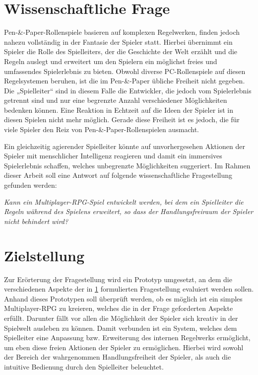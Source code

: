 \section{Wissenschaftliche Frage}
\label{sec:WissenschaftlicheFrage}

Pen-\&-Paper-Rollenspiele basieren auf komplexen Regelwerken, finden jedoch nahezu vollständig in der Fantasie der Spieler statt. Hierbei übernimmt ein Spieler die Rolle des Spielleiters, der die Geschichte der Welt erzählt und die Regeln auslegt und erweitert um den Spielern ein möglichst freies und umfassendes Spielerlebnis zu bieten. Obwohl diverse PC-Rollenspiele auf diesen Regelsystemen beruhen, ist die im Pen-\&-Paper übliche Freiheit nicht gegeben. Die „Spielleiter“ sind in diesem Falle die Entwickler, die jedoch vom Spielerlebnis getrennt sind und nur eine begrenzte Anzahl verschiedener Möglichkeiten bedenken können. Eine Reaktion in Echtzeit auf die Ideen der Spieler ist in diesen Spielen nicht mehr möglich. Gerade diese Freiheit ist es jedoch, die für viele Spieler den Reiz von Pen-\&-Paper-Rollenspielen ausmacht.

Ein gleichzeitig agierender Spielleiter könnte auf unvorhergesehen Aktionen der Spieler mit menschlicher Intelligenz reagieren und damit ein immersives Spielerlebnis schaffen, welches unbegrenzte Möglichkeiten suggeriert.
Im Rahmen dieser Arbeit soll eine Antwort auf folgende wissenschaftliche Fragestellung gefunden werden:
\vspace*{0.5em}\begin{center}\parbox{0.9\linewidth}{
  \emph{Kann ein Multiplayer-RPG-Spiel entwickelt werden, bei dem ein Spielleiter die Regeln während des Spielens erweitert, so dass der Handlungsfreiraum der Spieler nicht behindert wird?}
} \end{center}\vspace*{0.5em}

\section{Zielstellung}
\label{sec:Zielstellung}

Zur Erörterung der Fragestellung wird ein Prototyp umgesetzt, an dem die verschiedenen Aspekte der in \ref{sec:WissenschaftlicheFrage} formulierten Fragestellung evaluiert werden sollen. Anhand dieses Prototypen soll überprüft werden, ob es möglich ist ein simples Multiplayer-RPG zu kreieren, welches die in der Frage geforderten Aspekte erfüllt. Darunter fällt vor allen die Möglichkeit der Spieler sich kreativ in der Spielwelt ausleben zu können. Damit verbunden ist ein System, welches dem Spielleiter eine Anpassung bzw. Erweiterung des internen Regelwerks ermöglicht, um eben diese freien Aktionen der Spieler zu ermöglichen. Hierbei wird sowohl der Bereich der wahrgenommen Handlungsfreiheit der Spieler, als auch die intuitive Bedienung durch den Spielleiter beleuchtet.


